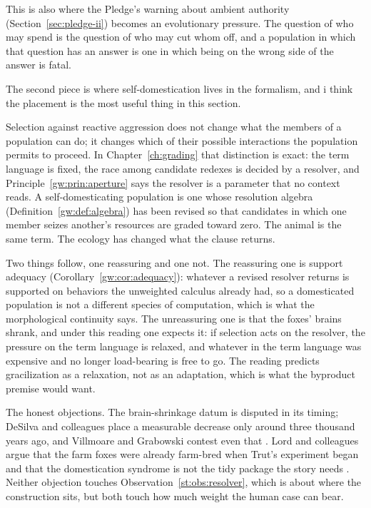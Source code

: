 \noindent
This is also where the Pledge's warning about ambient authority (Section~\ref{sec:pledge-ii}) becomes an evolutionary pressure. The question of who may spend is the question of who may cut whom off, and a population in which that question has an answer is one in which being on the wrong side of the answer is fatal.

The second piece is where self-domestication lives in the formalism, and i think the placement is the most useful thing in this section.

\begin{observation}
\label{st:obs:resolver}
Selection against reactive aggression does not change what the members of a population can do; it changes which of their possible interactions the population permits to proceed. In Chapter~\ref{ch:grading} that distinction is exact: the term language is fixed, the race among candidate redexes is decided by a resolver, and Principle~\ref{gw:prin:aperture} says the resolver is a parameter that no context reads. A self-domesticating population is one whose resolution algebra (Definition~\ref{gw:def:algebra}) has been revised so that candidates in which one member seizes another's resources are graded toward zero. The animal is the same term. The ecology has changed what the clause returns.
\end{observation}

\noindent
Two things follow, one reassuring and one not. The reassuring one is support adequacy (Corollary~\ref{gw:cor:adequacy}): whatever a revised resolver returns is supported on behaviors the unweighted calculus already had, so a domesticated population is not a different species of computation, which is what the morphological continuity says. The unreassuring one is that the foxes' brains shrank, and under this reading one expects it: if selection acts on the resolver, the pressure on the term language is relaxed, and whatever in the term language was expensive and no longer load-bearing is free to go. The reading predicts gracilization as a relaxation, not as an adaptation, which is what the byproduct premise would want.

The honest objections. The brain-shrinkage datum is disputed in its timing; DeSilva and colleagues place a measurable decrease only around three thousand years ago, and Villmoare and Grabowski contest even that \cite{desilva2021,villmoare2022}. Lord and colleagues argue that the farm foxes were already farm-bred when Trut's experiment began and that the domestication syndrome is not the tidy package the story needs \cite{lord2020}. Neither objection touches Observation~\ref{st:obs:resolver}, which is about where the construction sits, but both touch how much weight the human case can bear.

